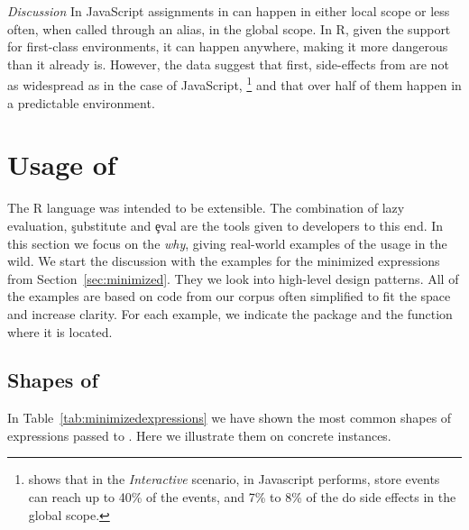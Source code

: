 \documentclass[review,screen,acmsmall,anonymous=true]{acmart}
\newcommand{\mypara}[1]{\medskip\noindent\emph{#1}\xspace}
\begin{document}
\mypara{Discussion} In JavaScript assignments in \eval can happen in either
local scope or less often, when called through an alias, in the global scope.
In R, given the support for first-class environments, it can happen anywhere, 
making it \eval more dangerous than it already is. However, the data  suggest
that first, side-effects from \eval are not as widespread as in the case of
JavaScript, \footnote{\citep{ecoop11} shows that in the \emph{Interactive} scenario, \eval in Javascript performs, store events can reach up to 40\% of the events, and 7\% to 8\% of the \eval do side effects in the global scope. } and that over half of them happen in a predictable environment.

\section{Usage of \eval}

The R language was intended to be extensible. The combination of lazy
evaluation, \c{substitute} and \c{eval} are the tools given to developers to
this end.
In this section we focus on the \emph{why}, giving real-world examples of the
\eval usage in the wild. We start the discussion with the examples for the
minimized expressions from Section~\ref{sec:minimized}. They we look into
high-level \eval design patterns. All of the examples are based on code from
our corpus often simplified to fit the space and increase clarity. For each
example, we indicate the package and the function where it is located.

\subsection{Shapes of \eval}

In Table~\ref{tab:minimizedexpressions} we have shown the most common shapes of expressions passed to \eval.
Here we illustrate them on concrete instances.
\end{document}
